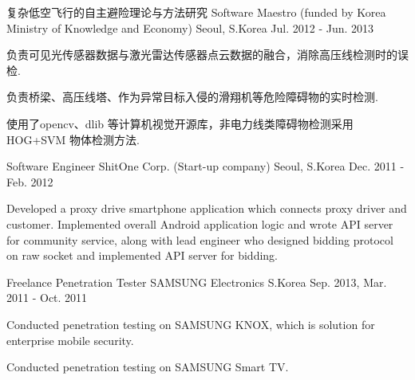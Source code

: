 \begin{cventries}
  \cventry
    {复杂低空飞行的自主避险理论与方法研究} %
    {Software Maestro (funded by Korea Ministry of Knowledge and Economy)} %
    {Seoul, S.Korea} %
    {Jul. 2012 - Jun. 2013} %
    {
      \begin{cvitems} %
        \item {负责可见光传感器数据与激光雷达传感器点云数据的融合，消除高压线检测时的误检.}
        \item {负责桥梁、高压线塔、作为异常目标入侵的滑翔机等危险障碍物的实时检测.}
        \item {使用了opencv、dlib 等计算机视觉开源库，非电力线类障碍物检测采用HOG+SVM 物体检测方法.}
      \end{cvitems}
    }

  \cventry
    {Software Engineer} %
    {ShitOne Corp. (Start-up company)} %
    {Seoul, S.Korea} %
    {Dec. 2011 - Feb. 2012} %
    {
      \begin{cvitems} %
        \item {Developed a proxy drive smartphone application which connects proxy driver and customer. Implemented overall Android application logic and wrote API server for community service, along with lead engineer who designed bidding protocol on raw socket and implemented API server for bidding.}
      \end{cvitems}
    }

  \cventry
    {Freelance Penetration Tester} %
    {SAMSUNG Electronics} %
    {S.Korea} %
    {Sep. 2013, Mar. 2011 - Oct. 2011} %
    {
      \begin{cvitems} %
        \item {Conducted penetration testing on SAMSUNG KNOX, which is solution for enterprise mobile security.}
        \item {Conducted penetration testing on SAMSUNG Smart TV.}
      \end{cvitems}
    }

\end{cventries}

